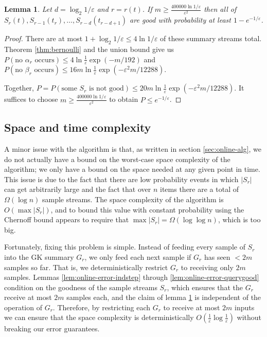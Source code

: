 \documentclass{article}
\theoremstyle{plain}
\newtheorem{lemma}[theorem]{Lemma}
\def\ep{\varepsilon}
\def\pl{\!+\!}
\newcommand{\p}[1]{(#1)}
\newcommand{\abs}[1]{|#1|}
\newcommand{\expp}[1]{\exp\p{#1}}
\renewcommand{\P}[1]{P\p{#1}}
\newcommand{\OO}[1]{O\p{#1}}
\newcommand{\OM}[1]{\Omega\p{#1}}
\newcommand{\OT}[1]{\Omega\p{#1}}
\newcommand{\eva}[1]{\alpha_{#1}}
\newcommand{\evb}[1]{\beta_{#1}}
\begin{document}
\begin{lemma}
  \label{lem:online-error-goodprob}
  Let $d = \log_2 1/\ep$ and $r = r\p{t}$. If $m \ge \frac{400000 \ln
    1/\ep}{\ep^2}$ then all of $S_r\p{t}, S_{r-1}\p{t_r}, \ldots,
  S_{r-d}\p{t_{r-d+1}}$ are good with probability at least $1 - e^{-1/\ep}$.
\end{lemma}
\begin{proof}
  There are at most $1 \pl \log_2 1/\ep \le 4 \ln 1/\ep$ of these summary
  streams total. Theorem \ref{thm:bernoulli} and the union bound give us
  $\P{\text{no $\eva{r}$ occurs}} \le 4 \ln \frac{1}{\ep} \expp{-m/192}$ and
  $\P{\text{no $\evb{r}$ occurs}} \le 16 m \ln \frac{1}{\ep} \expp{-\ep^2
    m/12288}$.

  Together, $P = \P{\text{some $S_r$ is not good}} \le 20 m \ln \frac{1}{\ep}
  \expp{-\ep^2 m/12288}$. It suffices to choose $m \ge \frac{400000 \ln
    1/\ep}{\ep^2}$ to obtain $P \le e^{-1/\ep}$.
\end{proof}



\subsection{Space and time complexity}
\label{sec:online-spacetime}

A minor issue with the algorithm is that, as written in section
\ref{sec:online-alg}, we do not actually have a bound on the worst-case space
complexity of the algorithm; we only have a bound on the space needed at any
given point in time. This issue is due to the fact that there are low
probability events in which $\abs{S_r}$ can get arbitrarily large and the fact
that over $n$ items there are a total of $\OT{\log n}$ sample streams. The space
complexity of the algorithm is $\OO{\max \abs{S_r}}$, and to bound this value
with constant probability using the Chernoff bound appears to require that $\max
\abs{S_r} = \OM{\log \log n}$, which is too big.

Fortunately, fixing this problem is simple. Instead of feeding every sample of
$S_r$ into the GK summary $G_r$, we only feed each next sample if $G_r$ has seen
$< 2 m$ samples so far. That is, we deterministically restrict $G_r$ to
receiving only $2 m$ samples. Lemmas \ref{lem:online-error-indstep} through
\ref{lem:online-error-querygood} condition on the goodness of the sample streams
$S_r$, which ensures that the $G_r$ receive at most $2 m$ samples each, and the
claim of lemma \ref{lem:online-error-goodprob} is independent of the operation
of $G_r$. Therefore, by restricting each $G_r$ to receive at most $2 m$ inputs
we can ensure that the space complexity is deterministically $\OO{\frac{1}{\ep}
  \log \frac{1}{\ep}}$ without breaking our error guarantees.
\end{document}
